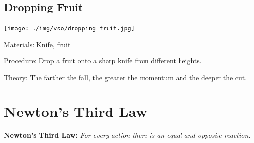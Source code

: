 \begin{multicols}{2}
\subsection{Dropping Fruit}

\begin{center}
\texttt{[image: ./img/vso/dropping-fruit.jpg]}
\end{center}

\begin{description*}
\item[Materials:]{Knife, fruit}
\item[Procedure:]{Drop a fruit onto a sharp knife from different heights.}
\item[Theory:]{The farther the fall, the greater the momentum and the deeper the cut.}
\end{description*}

%
%


\section*{Newton's Third Law}
\textbf{Newton's Third Law: }\emph{For every action there is an equal and opposite reaction.}


\end{multicols}
